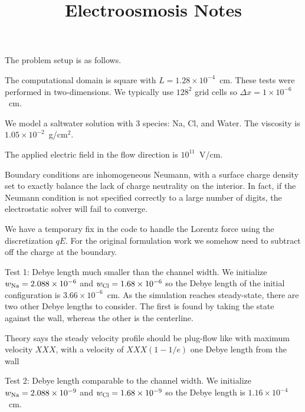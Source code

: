 \documentclass[final]{siamltex}
\begin{document}
\title{Electroosmosis Notes}

\maketitle

\cite{LowMachElectro} The problem setup is as follows.

The computational domain is square with $L=1.28\times 10^{-4}$~cm.
These tests were performed in two-dimensions.  We typically use
$128^2$ grid cells so $\Delta x = 1\times 10^{-6}$~cm.

We model a saltwater solution with 3 species: Na, Cl, and Water.
The viscosity is $1.05\times 10^{-2}$~g/cm$^2$.

The applied electric field in the flow direction is $10^{11}$~V/cm.


Boundary conditions are inhomogeneous Neumann, with a surface charge
density set to exactly balance the lack of charge neutrality on the interior.
In fact, if the Neumann condition is not specified correctly to a large number
of digits, the electrostatic solver will fail to converge.

We have a temporary fix in the code to handle the Lorentz force using the
discretization $qE$.  For the original formulation work we somehow need to
subtract off the charge at the boundary.


Test 1: Debye length much smaller than the channel width.
We initialize $w_{\rm Na} = 2.088\times 10^{-6}$ and
$w_{\rm Cl} = 1.68\times 10^{-6}$ so the Debye length of the initial
configuration is $3.66\times 10^{-6}$~cm.  As the simulation reaches
steady-state, there are two other Debye lengths to consider.  The first is
found by taking the state against the wall, whereas the other is the
centerline.

Theory says the steady velocity profile should be
plug-flow like with maximum velocity $XXX$, with
a velocity of $XXX (1-1/e)$ one Debye length from the wall

Test 2: Debye length comparable to the channel width.
We initialize $w_{\rm Na} = 2.088\times 10^{-9}$ and
$w_{\rm Cl} = 1.68\times 10^{-9}$ so the Debye length is
$1.16\times 10^{-4}$~cm.



\end{document}
